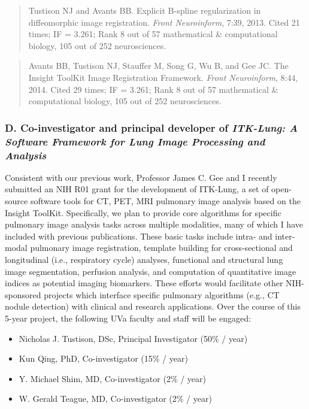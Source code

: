 \documentclass[11pt,]{article}
\providecommand{\tightlist}{%
  \setlength{\itemsep}{0pt}\setlength{\parskip}{0pt}}
\begin{document}
\begin{quote}
Tustison NJ and Avants BB. Explicit B-spline regularization in
diffeomorphic image registration. \emph{Front Neuroinform}, 7:39, 2013.
Cited 21 times; IF = 3.261; Rank 8 out of 57 mathematical \&
computational biology, 105 out of 252 neurosciences.
\end{quote}

\begin{quote}
Avants BB, Tustison NJ, Stauffer M, Song G, Wu B, and Gee JC. The
Insight ToolKit Image Registration Framework. \emph{Front Neuroinform},
8:44, 2014. Cited 29 times; IF = 3.261; Rank 8 out of 57 mathematical \&
computational biology, 105 out of 252 neurosciences.
\end{quote}

\subsubsection{\texorpdfstring{D. Co-investigator and principal
developer of \emph{ITK-Lung: A Software Framework for Lung Image
Processing and
Analysis}}{D. Co-investigator and principal developer of ITK-Lung: A Software Framework for Lung Image Processing and Analysis}}\label{d.-co-investigator-and-principal-developer-of-itk-lung-a-software-framework-for-lung-image-processing-and-analysis}

Consistent with our previous work, Professor James C. Gee and I recently
submitted an NIH R01 grant for the development of ITK-Lung, a set of
open-source software tools for CT, PET, MRI pulmonary image analysis
based on the Insight ToolKit. Specifically, we plan to provide core
algorithms for specific pulmonary image analysis tasks across multiple
modalities, many of which I have included with previous publications.
These basic tasks include intra- and inter-modal pulmonary image
registration, template building for cross-sectional and longitudinal
(i.e., respiratory cycle) analyses, functional and structural lung image
segmentation, perfusion analysis, and computation of quantitative image
indices as potential imaging biomarkers. These efforts would facilitate
other NIH-sponsored projects which interface specific pulmonary
algorithms (e.g., CT nodule detection) with clinical and research
applications. Over the course of this 5-year project, the following UVa
faculty and staff will be engaged:

\begin{itemize}
\tightlist
\item
  Nicholas J. Tustison, DSc, Principal Investigator (50\% / year)
\item
  Kun Qing, PhD, Co-investigator (15\% / year)
\item
  Y. Michael Shim, MD, Co-investigator (2\% / year)
\item
  W. Gerald Teague, MD, Co-investigator (2\% / year)
\end{itemize}
\end{document}
